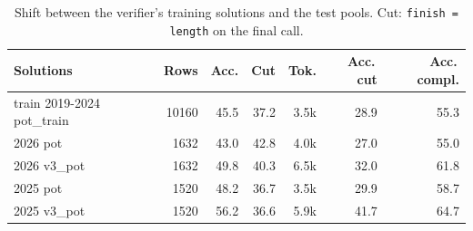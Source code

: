 \begin{table}[!t]
\centering
\scriptsize
\caption{Shift between the verifier's training solutions and the test pools. Cut: \texttt{finish = length} on the final call.}
\label{tab:shift}
\setlength{\tabcolsep}{2.5pt}
\begin{tabular}{lrrrrrr}
\toprule
Solutions & Rows & Acc. & Cut & Tok. & Acc.\,cut & Acc.\,compl. \\
\midrule
train 2019-2024 pot\_train & 10160 & 45.5 & 37.2 & 3.5k & 28.9 & 55.3 \\
2026 pot & 1632 & 43.0 & 42.8 & 4.0k & 27.0 & 55.0 \\
2026 v3\_pot & 1632 & 49.8 & 40.3 & 6.5k & 32.0 & 61.8 \\
2025 pot & 1520 & 48.2 & 36.7 & 3.5k & 29.9 & 58.7 \\
2025 v3\_pot & 1520 & 56.2 & 36.6 & 5.9k & 41.7 & 64.7 \\
\bottomrule
\end{tabular}
\end{table}
